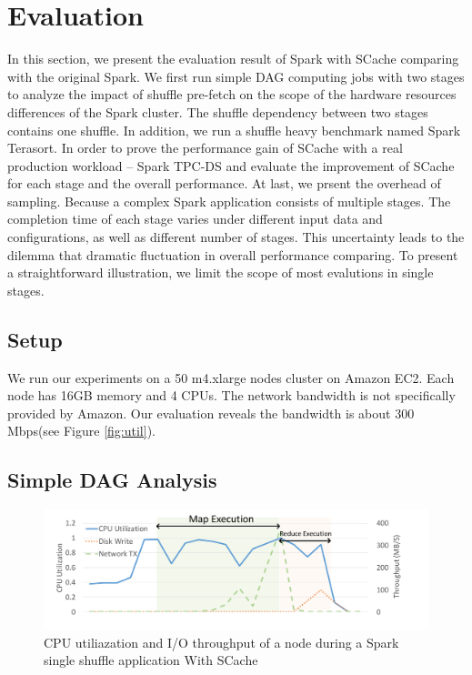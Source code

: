 \section{Evaluation}\label{evaluation}

In this section, we present the evaluation result of Spark with SCache comparing with the original Spark. We first run simple DAG computing jobs with two stages to analyze the impact of shuffle pre-fetch on the scope of the hardware resources differences of the Spark cluster. The shuffle dependency between two stages contains one shuffle. In addition, we run a shuffle heavy benchmark named Spark Terasort\cite{spark-tera}. In order to prove the performance gain of SCache with a real production workload -- Spark TPC-DS\cite{sparktpcds} and evaluate the improvement of SCache for each stage and the overall performance. At last, we prsent the overhead of sampling. Because a complex Spark application consists of multiple stages. The completion time of each stage varies under different input data and configurations, as well as different number of stages. This uncertainty leads to the dilemma that dramatic fluctuation in overall performance comparing. To present a straightforward illustration, we limit the scope of most evalutions in single stages. 

\subsection{Setup}\label{stepup}
We run our experiments on a 50 m4.xlarge nodes cluster on Amazon EC2\cite{aws}. Each node has 16GB memory and 4 CPUs. The network bandwidth is not specifically provided by Amazon. Our evaluation reveals the bandwidth is about 300 Mbps(see Figure \ref{fig:util}).

\subsection{Simple DAG Analysis}


\begin{figure}
	\includegraphics[width=\linewidth]{fig/scache_util}
	\caption{CPU utiliazation and I/O throughput of a node during a Spark single shuffle application With SCache}
	\label{fig:scache_util}
\end{figure}


